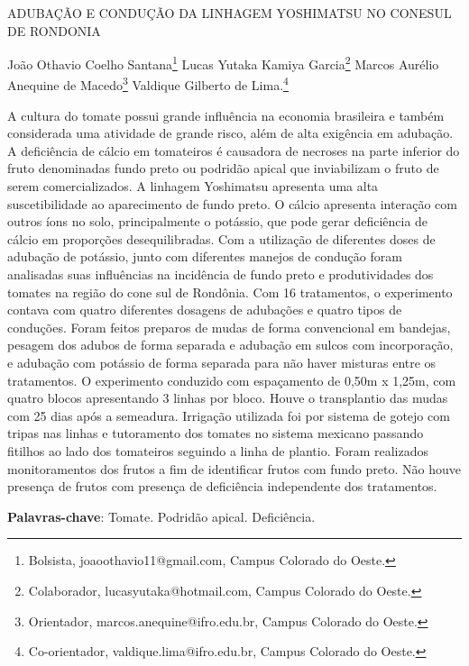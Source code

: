 \documentclass[article,12pt,onesidea,4paper,english,brazil]{abntex2}
\begin{document}
	
	
	\frenchspacing 
	
	\begin{center}
		\LARGE ADUBAÇÃO E CONDUÇÃO DA LINHAGEM YOSHIMATSU NO CONESUL DE RONDONIA
		
		\normalsize
		João Othavio Coelho Santana\footnote{Bolsista, joaoothavio11@gmail.com, Campus Colorado do Oeste.} 
		Lucas Yutaka Kamiya Garcia\footnote{Colaborador, lucasyutaka@hotmail.com, Campus Colorado do Oeste.} 
		Marcos Aurélio Anequine de Macedo\footnote{Orientador, marcos.anequine@ifro.edu.br, Campus Colorado do Oeste.} 
		Valdique Gilberto de Lima.\footnote{Co-orientador, valdique.lima@ifro.edu.br, Campus Colorado do Oeste.} 
	\end{center}
	
	\noindent A cultura do tomate possui grande influência na economia brasileira e também
	considerada uma atividade de grande risco, além de alta exigência em adubação. A
	deficiência de cálcio em tomateiros é causadora de necroses na parte inferior do
	fruto denominadas fundo preto ou podridão apical que inviabilizam o fruto de serem
	comercializados. A linhagem Yoshimatsu apresenta uma alta suscetibilidade ao
	aparecimento de fundo preto. O cálcio apresenta interação com outros íons no solo,
	principalmente o potássio, que pode gerar deficiência de cálcio em proporções
	desequilibradas. Com a utilização de diferentes doses de adubação de potássio,
	junto com diferentes manejos de condução foram analisadas suas influências na
	incidência de fundo preto e produtividades dos tomates na região do cone sul de
	Rondônia. Com 16 tratamentos, o experimento contava com quatro diferentes
	dosagens de adubações e quatro tipos de conduções. Foram feitos preparos de
	mudas de forma convencional em bandejas, pesagem dos adubos de forma
	separada e adubação em sulcos com incorporação, e adubação com potássio de
	forma separada para não haver misturas entre os tratamentos. O experimento
	conduzido com espaçamento de 0,50m x 1,25m, com quatro blocos apresentando 3
	linhas por bloco. Houve o transplantio das mudas com 25 dias após a semeadura.
	Irrigação utilizada foi por sistema de gotejo com tripas nas linhas e tutoramento dos
	tomates no sistema mexicano passando fitilhos ao lado dos tomateiros seguindo a
	linha de plantio. Foram realizados monitoramentos dos frutos a fim de identificar
	frutos com fundo preto. Não houve presença de frutos com presença de deficiência
	independente dos tratamentos.
	
	\vspace{\onelineskip}
	
	\noindent
	\textbf{Palavras-chave}: Tomate. Podridão apical. Deficiência.
	
\end{document}
